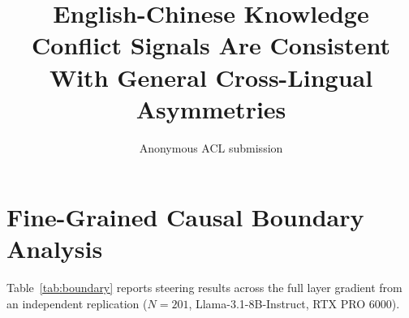 \documentclass[11pt]{article}
\title{English-Chinese Knowledge Conflict Signals Are Consistent With General Cross-Lingual Asymmetries}
\author{Anonymous ACL submission}
\begin{document}
\maketitle

\begin{abstract}

\end{abstract}

















\appendix

\section{Fine-Grained Causal Boundary Analysis}
\label{app:boundary}

Table~\ref{tab:boundary} reports steering results across the full layer gradient from an independent replication ($N = 201$, Llama-3.1-8B-Instruct, RTX PRO 6000).

\begin{table}[!t]
\centering
\caption{Causal boundary steering results (independently sampled, $N = 201$, Llama-3.1-8B-Instruct). Bonf.\ Sig.\ $\alpha$s: number of $\alpha$ values reaching significance after Bonferroni correction out of 6 tested.}
\label{tab:boundary}
\small
{}
\end{table}
\end{document}
